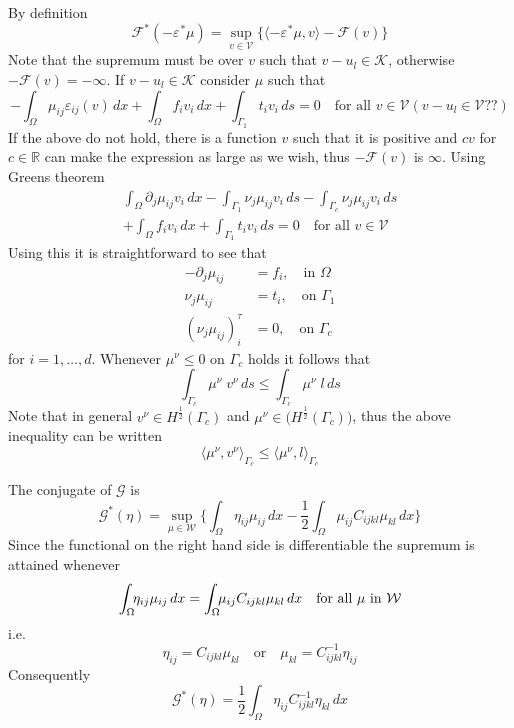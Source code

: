 \documentclass[12pt,a4paper]{article}
\numberwithin{equation}{section}
\numberwithin{table}{section}
\numberwithin{figure}{section}
\newcommand{\R}{\ensuremath{\mathbb{R}}}
\newcommand{\W}{\ensuremath{\mathcal{W}}}
\newcommand{\half}{\ensuremath{\frac{1}{2}}}
\newcommand{\pd}[1]{\ensuremath{\partial_{#1}}}
\renewcommand{\dj}{\pd{j}}
\newcommand{\V}{\ensuremath{\mathcal{V}}}
\newcommand{\K}{\ensuremath{\mathcal{K}}}
\newcommand{\F}{\ensuremath{{\mathcal F}}}
\newcommand{\G}{\ensuremath{{\mathcal G}}}
\newcommand{\intO}{\int_\Omega\!\!}
\newcommand{\intG}[1][0]{\int_{\Gamma_{#1}}\!\!}
\renewcommand{\epsilon}{\varepsilon}
\newcommand{\strain}[1][]{\ensuremath{\epsilon_{#1}}}
\newcommand{\epsij}{\strain[ij]}
\providecommand{\dualp}[2]{\langle #1, #2 \rangle}
\newcommand{\supvinV}{\ensuremath{\sup_{v\in \V}}}
\newcommand{\dx}{{\,dx}}
\newcommand{\ds}{{\,ds}}
\begin{document}
By definition
\begin{equation}
  \F^*(-\strain^* \mu) = \supvinV \{\dualp{-\strain^* \mu}{v} - \F(v) \}
\end{equation}
Note that the supremum must be over $v$ such that $v-u_l \in \K$,
otherwise $-\F(v) = -\infty$.  If $v-u_l\in \K$ consider $\mu$ such that
\begin{equation}
  -\intO \mu_{ij} \epsij(v) \dx + \intO f_i v_i \dx
  + \intG[1] t_i v_i \ds = 0 \quad\text{for all }v\in \V (v-u_l\in \V \text{??})
\end{equation}
If the above do not hold, there is a function $v$ such that it is
positive and $cv$ for $c\in\R$ can make the expression as
large as we wish, thus $-\F(v)$ is $\infty$.  Using Greens theorem
\begin{multline}
  \intO \dj \mu_{ij} v_i \dx - \intG[1] \nu_j \mu_{ij} v_i \ds
  - \intG[c] \nu_j \mu_{ij} v_i \ds  \\
  + \intO f_i v_i \dx
  + \intG[1] t_i v_i \ds = 0 \quad\text{for all } v\in \V 
\end{multline}
Using this it is straightforward to see that
\begin{equation}
  \label{eq:stressEquilibrium}
  \begin{split}
    -\dj \mu_{ij} &= f_i,\quad\text{in }\Omega \\
    \nu_j \mu_{ij} &= t_i,\quad\text{on }\Gamma_1 \\
    (\nu_j \mu_{ij})^\tau_i &= 0,\quad\text{on }\Gamma_c
  \end{split}
\end{equation}
for $i=1,\ldots,d$.  Whenever $\mu^\nu \le 0$ on $\Gamma_c$ holds it follows that
\begin{equation}
  \intG[c] \mu^\nu \;v^\nu \ds
  \le \intG[c] \mu^\nu \;l \ds
\end{equation}
Note that in general $v^\nu \in H^\half(\Gamma_c)$ and $\mu^\nu \in
\bigl(H^\half(\Gamma_c)\bigr)$, thus the above inequality can be written
\begin{equation}
  \dualp{\mu^\nu}{v^\nu}_{\Gamma_c} \le \dualp{\mu^\nu}{l}_{\Gamma_c}
\end{equation}

The conjugate of $\G$ is
\begin{equation}
  \G^*(\eta) = \sup_{\mu\in \W} \{ \intO \eta_{ij} \mu_{ij} \dx
  - \half \intO \mu_{ij} C_{ijkl} \mu_{kl} \dx \}
\end{equation}
Since the functional on the right hand side is differentiable the
supremum is attained whenever
\begin{equation}
  \label{eq:epsopt}
  \intO \eta_{ij} \mu_{ij} \dx =  \intO \mu_{ij} C_{ijkl} \mu_{kl} \dx
  \quad \text{for all $\mu$ in \W}
\end{equation}
i.e.
\begin{equation}
  \eta_{ij} = C_{ijkl} \mu_{kl}  \quad\text{or}\quad
  \mu_{kl} = C^{-1}_{ijkl} \eta_{ij}
\end{equation}
Consequently
\begin{equation}
  \G^*(\eta) = \half\intO \eta_{ij} C^{-1}_{ijkl} \eta_{kl} \dx
\end{equation}
\end{document}
